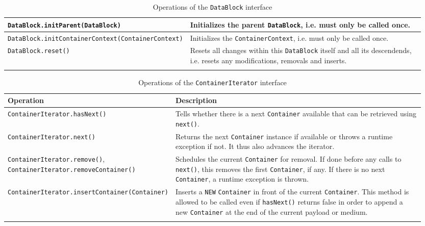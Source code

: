 \begin{landscape}
\begin{longtable}{|p{0.3\linewidth}|p{0.65\linewidth}|}
\hline
\texttt{DataBlock}\linebreak\texttt{.initParent(DataBlock)} & Initializes the parent \texttt{DataBlock}, i.e. must only be called once. \\
\hline
\texttt{DataBlock}\linebreak\texttt{.initContainerContext(ContainerContext)} & Initializes the \texttt{ContainerContext}, i.e. must only be called once. \\
\hline
\texttt{DataBlock}\linebreak\texttt{.reset()} & Resets all changes within this \texttt{DataBlock} itself and all its descendends, i.e. resets any modifications, removals and inserts. \\
\hline
\caption{Operations of the \texttt{DataBlock} interface}
\label{tab:DBOpsDatablock}
\end{longtable}
\end{landscape}
\normalsize

\small
\begin{landscape}
\begin{longtable}{|p{0.3\linewidth}|p{0.65\linewidth}|}
\hline
\rowcolor[gray]{.9}\textbf{Operation} & \textbf{Description} \\
\endhead
\hline
\texttt{ContainerIterator}\linebreak\texttt{.hasNext()} & Tells whether there is a next \texttt{Container} available that can be retrieved using \texttt{next()}. \\
\hline
\texttt{ContainerIterator}\linebreak\texttt{.next()} & Returns the next \texttt{Container} instance if available or throws a runtime exception if not. It thus also advances the iterator. \\
\hline
\texttt{ContainerIterator}\linebreak\texttt{.remove()}, \texttt{ContainerIterator.removeContainer()} & Schedules the current \texttt{Container} for removal. If done before any calls to \texttt{next()}, this removes the first \texttt{Container}, if any. If there is no next \texttt{Container}, a runtime exception is thrown. \\
\hline
\texttt{ContainerIterator}\linebreak\texttt{.insertContainer(Container)} & Inserts a \texttt{NEW} \texttt{Container} in front of the current \texttt{Container}. This method is allowed to be called even if \texttt{hasNext()} returns false in order to append a new \texttt{Container} at the end of the current payload or medium. \\
\hline
\caption{Operations of the \texttt{ContainerIterator} interface}
\label{tab:DBOpsContainerIterator}
\end{longtable}
\end{landscape}
\normalsize

